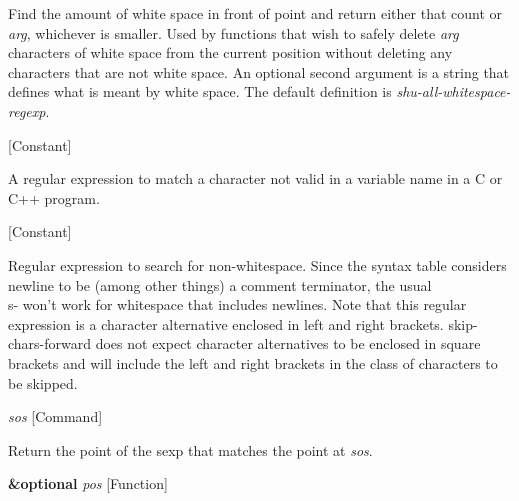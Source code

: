 \begin{doc-string}
Find the amount of white space in front of point and return either that
count or \emph{arg}, whichever is smaller.  Used by functions that wish to
safely delete \emph{arg} characters of white space from the current position
without deleting any characters that are not white space.
An optional second argument is a string that defines what is meant
by white space.  The default definition is \emph{shu-all-whitespace-regexp}.
\end{doc-string}

\vspace{1em}
\noindent
{}
\usebox{\funcname}
 \hfill [Constant]

\begin{doc-string}
A regular expression to match a character not valid in a variable name
in a C or C++ program.
\end{doc-string}

\vspace{1em}
\noindent
{}
\usebox{\funcname}
 \hfill [Constant]

\begin{doc-string}
Regular expression to search for non-whitespace.  Since the syntax table considers
newline to be (among other things) a comment terminator, the usual \\s- won't work
for whitespace that includes newlines.  Note that this regular expression is a
character alternative enclosed in left and right brackets.  skip-chars-forward does
not expect character alternatives to be enclosed in square brackets and will include
the left and right brackets in the class of characters to be skipped.
\end{doc-string}

\vspace{1em}
\noindent
{}
\usebox{\funcname}\emph{sos}
 \hfill [Command]

\begin{doc-string}
Return the point of the sexp that matches the point at \emph{sos}.
\end{doc-string}

\vspace{1em}
\noindent
{}
\usebox{\funcname}\textbf{\&optional} \emph{pos}
 \hfill [Function]

